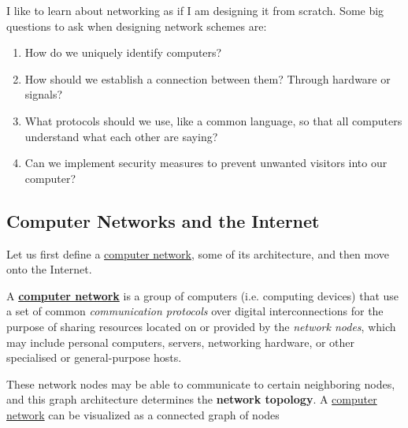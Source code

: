 \documentclass{article}
\newcounter{question}[section]
\newcounter{definition}[section]
\begin{document}
  I like to learn about networking as if I am designing it from scratch. Some big questions to ask when designing network schemes are:

  \begin{enumerate}
    \item How do we uniquely identify computers? 
    \item How should we establish a connection between them? Through hardware or signals? 
    \item What protocols should we use, like a common language, so that all computers understand what each other are saying? 
    \item Can we implement security measures to prevent unwanted visitors into our computer? 
  \end{enumerate} 

  \subsection{Computer Networks and the Internet}

    Let us first define a \hyperref[def:computer-network]{computer network}, some of its architecture, and then move onto the Internet. 

    \begin{definition}
      \label{def:computer-network-2}
      A \textbf{\hyperref[def:computer-network]{computer network}} is a group of computers (i.e. computing devices) that use a set of common \textit{communication protocols} over digital interconnections for the purpose of sharing resources located on or provided by the \textit{network nodes}, which may include personal computers, servers, networking hardware, or other specialised or general-purpose hosts. 

    \end{definition}

    These network nodes may be able to communicate to certain neighboring nodes, and this graph architecture determines the \textbf{network topology}. A \hyperref[def:computer-network-2]{computer network} can be visualized as a connected graph of nodes 
\end{document}

